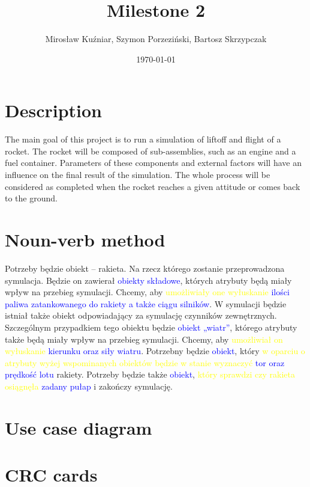 \documentclass{article}
\title{Milestone 2}
\author{Mirosław Kuźniar, Szymon Porzeziński, Bartosz Skrzypczak }
\date{\today}
\begin{document}
\maketitle

\section{Description}
The main goal of this project is to run a simulation of liftoff and flight of a rocket. The rocket will be composed of sub-assemblies, such as an engine and a fuel container. Parameters of these components and external factors will have an influence on the final result of the simulation. The whole process will be considered as completed when the rocket reaches a given attitude or comes back to the ground. 

\section{Noun-verb method}
Potrzeby będzie obiekt – rakieta. Na rzecz którego zostanie przeprowadzona symulacja. Będzie on zawierał \textcolor{blue}{obiekty składowe}, których atrybuty będą miały wpływ na przebieg symulacji. Chcemy, aby \textcolor{yellow}{umożliwiały one wyłuskanie} \textcolor{blue}{ilości paliwa zatankowanego do rakiety a także ciągu silników}. W symulacji będzie istniał także obiekt odpowiadający za symulację czynników zewnętrznych. Szczególnym przypadkiem tego obiektu będzie \textcolor{blue}{obiekt „wiatr”}, którego atrybuty także będą miały wpływ na przebieg symulacji. Chcemy, aby \textcolor{yellow}{umożliwiał on wyłuskanie} \textcolor{blue}{kierunku oraz siły wiatru}. Potrzebny będzie \textcolor{blue}{obiekt}, który \textcolor{yellow}{w oparciu o atrybuty wyżej wspominanych obiektów będzie w stanie wyznaczyć} \textcolor{blue}{tor oraz prędkość lotu} rakiety. Potrzeby będzie także  \textcolor{blue}{obiekt}, \textcolor{yellow}{który sprawdzi czy rakieta osiągnęła} \textcolor{blue}{zadany pułap} i zakończy symulację. 

\section{Use case diagram}

\section{CRC cards}
\end{document}

